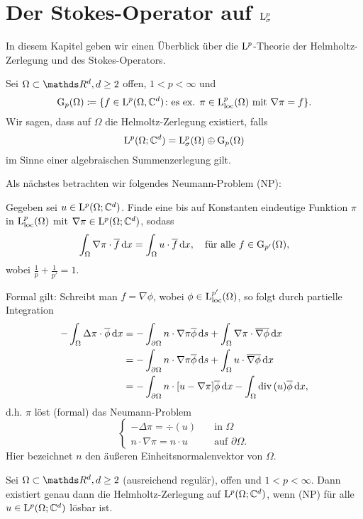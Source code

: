 \chapter{Der Stokes-Operator auf \texorpdfstring{$\mathrm{L}_\sigma^p$}{Lsigma\textasciicircum p}}

In diesem Kapitel geben wir einen Überblick über die $\mathrm{L}^p$-Theorie der Helmholtz-Zerlegung und des Stokes-Operators.

Sei $\Omega \subset \R^d, d \geq 2$ offen, $1 < p < \infty$ und 
$$
\mathrm{G}_p(\Omega) \coloneqq \{ f \in \mathrm{L}^p(\Omega, \mathbb{C}^d) \colon \text{es ex. } \pi \in \mathrm{L}_{\operatorname{loc}}^p(\Omega) \text{ mit } \nabla \pi = f\}.
$$
Wir sagen, dass auf $\Omega$ die Helmoltz-Zerlegung existiert, falls
$$
\mathrm{L}^p(\Omega; \mathbb{C}^d) = \mathrm{L}_\sigma^p(\Omega) \oplus \mathrm{G}_p(\Omega)
$$
im Sinne einer algebraischen Summenzerlegung gilt.

Als nächstes betrachten wir folgendes Neumann-Problem (NP):

Gegeben sei $u \in \mathrm{L}^p(\Omega; \mathbb{C}^d)$.
Finde eine bis auf Konstanten eindeutige Funktion $\pi$ in $\mathrm{L}_{\operatorname{loc}}^p(\Omega)$ mit $\nabla \pi \in \mathrm{L}^p(\Omega; \mathbb{C}^d)$, sodass
$$
\int_\Omega \nabla \pi \cdot \overline f \, {\operatorname{d}\!{x}} = \int_\Omega u \cdot \overline f \, {\operatorname{d}\!{x}}, \quad\text{für alle } f \in \mathrm{G}_{p'}(\Omega),
$$
wobei $\frac{1}{p} + \frac{1}{p'} = 1$.

Formal gilt: Schreibt man $f = \nabla \phi$, wobei $\phi \in \mathrm{L}^{p'}_{\operatorname{loc}}(\Omega)$, so folgt durch partielle Integration
\begin{align*}
  -\int_\Omega \Delta\pi \cdot \overline{\phi} \, {\operatorname{d}\!{x}}
  &= -\int_{\partial\Omega} n \cdot \nabla\pi \overline\phi \, {\operatorname{d}\!{s}}
     +\int_\Omega \nabla \pi \cdot \overline{\nabla \phi} \, {\operatorname{d}\!{x}} \\
  &= - \int_{\partial\Omega} n \cdot \nabla \pi \overline \phi \, {\operatorname{d}\!{s}} 
     + \int_\Omega u \cdot \overline{\nabla \phi} \, {\operatorname{d}\!{x}} \\
     &= -\int_{\partial\Omega} n \cdot [u - \nabla\pi] \overline \phi \, {\operatorname{d}\!{x}}
        - \int_\Omega \mathrm{div\,} (u) \overline\phi \, {\operatorname{d}\!{x}},
\end{align*}
d.h. $\pi$ löst (formal) das Neumann-Problem
$$
\begin{cases}
  -\Delta \pi = \div (u)         &\quad\text{in } \Omega \\
  n \cdot \nabla \pi = n \cdot u &\quad\text{auf } \partial\Omega.
\end{cases}
$$
Hier bezeichnet $n$ den äußeren Einheitsnormalenvektor von $\Omega$.

\begin{thm}
  \label{thm:helmholtzIffNeumann}
  Sei $\Omega \subset \R^d, d \geq 2$ (ausreichend regulär), offen und $1 < p < \infty$.
  Dann existiert genau dann die Helmholtz-Zerlegung auf $\mathrm{L}^p(\Omega; \mathbb{C}^d)$, wenn (NP) für alle $u \in \mathrm{L}^p(\Omega; \mathbb{C}^d)$ lösbar ist.
\end{thm}

